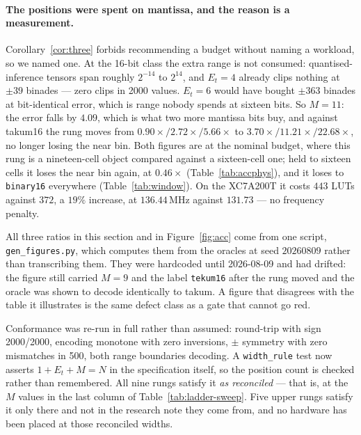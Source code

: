 \paragraph{The positions were spent on mantissa, and the reason is a measurement.}
Corollary~\ref{cor:three} forbids recommending a budget without naming a workload,
so we named one. At the 16-bit class the extra range is not consumed:
quantised-inference tensors span roughly $2^{-14}$ to $2^{14}$, and $E_t = 4$
already clips nothing at $\pm 39$ binades --- zero clips in 2000 values. $E_t = 6$
would have bought $\pm 363$ binades at bit-identical error, which is range nobody
spends at sixteen bits. So $M = 11$: the error falls by $4.09$, which is what two
more mantissa bits buy, and against takum16 the rung moves from
$0.90\times / 2.72\times / 5.66\times$ to $3.70\times / 11.21\times / 22.68\times$,
no longer losing the near bin. Both figures are at the nominal budget, where this
rung is a nineteen-cell object compared against a sixteen-cell one; held to
sixteen cells it loses the near bin again, at $0.46\times$
(Table~\ref{tab:accphys}), and it loses to \texttt{binary16} everywhere
(Table~\ref{tab:window}). On the XC7A200T it costs $443$ LUTs against $372$,
a $19\%$ increase, at $136.44$\,MHz against $131.73$ --- no frequency penalty.

All three ratios in this section and in Figure~\ref{fig:acc} come from one
script, \texttt{gen\_figures.py}, which computes them from the oracles at seed
$20260809$ rather than transcribing them. They were hardcoded until 2026-08-09 and
had drifted: the figure still carried $M = 9$ and the label \texttt{tekum16} after
the rung moved and the oracle was shown to decode identically to takum. A figure
that disagrees with the table it illustrates is the same defect class as a gate
that cannot go red.

Conformance was re-run in full rather than assumed: round-trip with sign
2000/2000, encoding monotone with zero inversions, $\pm$ symmetry with zero
mismatches in 500, both range boundaries decoding. A \texttt{width\_rule} test now
asserts $1 + E_t + M = N$ in the specification itself, so the position count is
checked rather than remembered. All nine rungs satisfy it \emph{as reconciled} ---
that is, at the $M$ values in the last column of Table~\ref{tab:ladder-sweep}. Five
upper rungs satisfy it only there and not in the research note they come from, and
no hardware has been placed at those reconciled widths.


